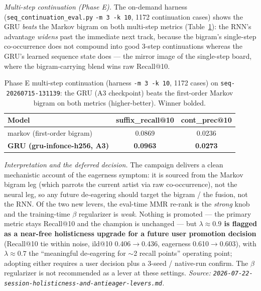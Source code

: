\documentclass[11pt]{article}
\newcommand{\dsid}[1]{\texttt{\small #1}}
\newcommand{\best}[1]{\textbf{#1}}
\begin{document}
\emph{Multi-step continuation (Phase E).} The on-demand harness
(\texttt{seq\_continuation\_eval.py} \texttt{-m 3 -k 10}, \num{1172} continuation
cases) shows the GRU \emph{beats} the Markov bigram on both multi-step metrics
(Table~\ref{tab:continuation}): the RNN's advantage \emph{widens} past the immediate
next track, because the bigram's single-step co-occurrence does not compound into
good 3-step continuations whereas the GRU's learned sequence state does --- the
mirror image of the single-step board, where the bigram-carrying blend wins raw
Recall@10.

\begin{table}[ht]
  \centering
  \caption{Phase E multi-step continuation (harness \texttt{-m 3 -k 10},
  \num{1172} cases) on \dsid{seq-20260715-131139}: the GRU (A3 checkpoint) beats the
  first-order Markov bigram on both metrics (higher-better). Winner bolded.}
  \label{tab:continuation}
  {\footnotesize\setlength{\tabcolsep}{6pt}\begin{tabular}{lcc}
    \toprule
    Model & suffix\_recall@10 & cont\_prec@10 \\
    \midrule
    markov (first-order bigram) & 0.0869 & 0.0236 \\
    \best{GRU (gru-infonce-h256, A3)} & \best{0.0963} & \best{0.0273} \\
    \bottomrule
  \end{tabular}}
\end{table}

\emph{Interpretation and the deferred decision.} The campaign delivers a clean
mechanistic account of the eagerness symptom: it is sourced from the Markov bigram
leg (which parrots the current artist via raw co-occurrence), not the neural leg, so
any future de-eagering should target the bigram / the fusion, not the RNN. Of the two
new levers, the eval-time MMR re-rank is the \emph{strong} knob and the training-time
$\beta$ regularizer is \emph{weak}. Nothing is promoted --- the primary metric stays
Recall@10 and the champion is unchanged --- but \textbf{$\lambda\approx\num{0.9}$ is
flagged as a near-free holisticness upgrade for a future user promotion decision}
(Recall@10 tie within noise, ild@10 \num{0.406}$\to$\num{0.436}, eagerness
\num{0.610}$\to$\num{0.603}), with $\lambda\approx\num{0.7}$ the ``meaningful
de-eagering for $\sim$2 recall points'' operating point; adopting either requires a
user decision plus a 3-seed / native-run confirm. The $\beta$ regularizer is not
recommended as a lever at these settings.
\emph{Source: \texttt{2026-07-22-session-holisticness-and-antieager-levers.md}.}
\end{document}
